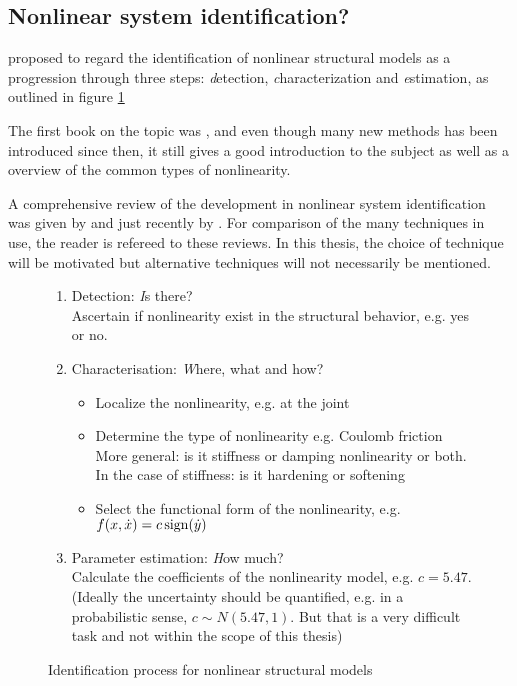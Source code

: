 \subsection{Nonlinear system identification?}
\label{sec:nonl-syst-ident}

\textcite{kerschen2006a} proposed to regard the identification of nonlinear
structural models as a progression through three steps: {\textit detection}, {\textit
  characterization} and {\textit estimation}, as outlined in figure
\ref{fig:ident_process}

The first book on the topic was \textcite{worden2000nonlinearity}, and even
though many new methods has been introduced since then, it still gives a good
introduction to the subject as well as a overview of the common types of
nonlinearity.

A comprehensive review of the development in nonlinear system identification was
given by \parencite{kerschen2006a} and just recently by \textcite{noel2016a}. For
comparison of the many techniques in use, the reader is refereed to these
reviews. In this thesis, the choice of technique will be motivated but
alternative techniques will not necessarily be mentioned.



\begin{figure}[ht!]
  \centering
  \begin{mdframed}
    \begin{enumerate}
    \item Detection: {\textit Is there?}\\
      Ascertain if nonlinearity exist in the structural behavior, e.g. yes or
      no.
    \item Characterisation: {\textit Where, what and how?}
      \begin{itemize}
      \item Localize the nonlinearity, e.g. at the joint
      \item Determine the type of nonlinearity e.g.  Coulomb friction\\
        More general: is it stiffness or damping nonlinearity or both. In the
        case of stiffness: is it hardening or softening
      \item Select the functional form of the nonlinearity, e.g.
        $f(x,\dot x) = c \operatorname{sign} (\dot y)$
      \end{itemize}
    \item Parameter estimation: {\textit How much?}\\
      Calculate the coefficients of the nonlinearity model, e.g. $c = 5.47$.\\
      (Ideally the uncertainty should be quantified, e.g. in a probabilistic
      sense, $c \sim N(5.47,1)$. But that is a very difficult task and not
      within the scope of this thesis)
    \end{enumerate}
  \end{mdframed}
  \caption{Identification process for nonlinear structural models}
  \label{fig:ident_process}
\end{figure}

